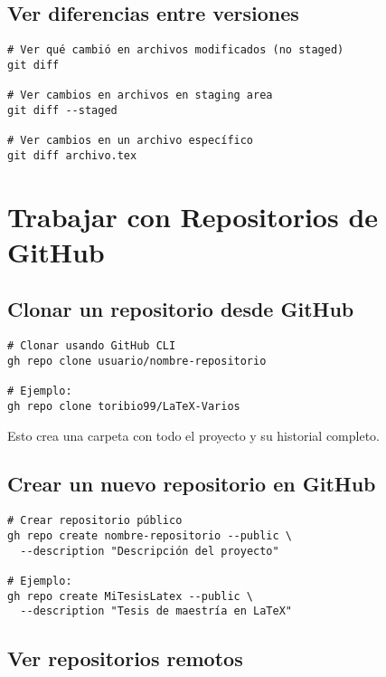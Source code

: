 \documentclass[11pt,a4paper]{article}
\begin{document}
\subsection{Ver diferencias entre versiones}

\begin{lstlisting}[style=bashstyle]
# Ver qué cambió en archivos modificados (no staged)
git diff

# Ver cambios en archivos en staging area
git diff --staged

# Ver cambios en un archivo específico
git diff archivo.tex
\end{lstlisting}

\section{Trabajar con Repositorios de GitHub}

\subsection{Clonar un repositorio desde GitHub}

\begin{lstlisting}[style=bashstyle]
# Clonar usando GitHub CLI
gh repo clone usuario/nombre-repositorio

# Ejemplo:
gh repo clone toribio99/LaTeX-Varios
\end{lstlisting}

Esto crea una carpeta con todo el proyecto y su historial completo.

\subsection{Crear un nuevo repositorio en GitHub}

\begin{lstlisting}[style=bashstyle]
# Crear repositorio público
gh repo create nombre-repositorio --public \
  --description "Descripción del proyecto"

# Ejemplo:
gh repo create MiTesisLatex --public \
  --description "Tesis de maestría en LaTeX"
\end{lstlisting}

\subsection{Ver repositorios remotos}
\end{document}
